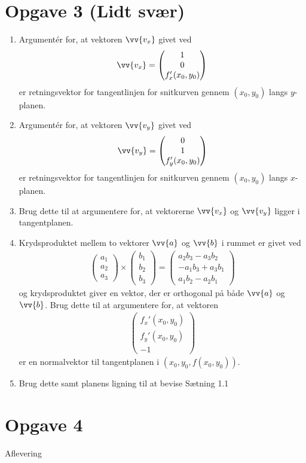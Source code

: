 \section*{Opgave 3 (Lidt svær)}

\begin{enumerate}[label=\roman*)]
	\item Argumentér for, at vektoren $\vv{v_x}$ givet ved 
	\begin{align*}
		\vv{v_x} = 
		\begin{pmatrix}
			1 \\ 0 \\ f_x'(x_0,y_0)
		\end{pmatrix}
	\end{align*}
	er retningsvektor for tangentlinjen for snitkurven gennem $(x_0,y_0)$ langs $y$-planen. 
	\item Argumentér for, at vektoren $\vv{v_y}$ givet ved 
	\begin{align*}
		\vv{v_y} = 
		\begin{pmatrix}
			0 \\ 1 \\ f_y'(x_0,y_0)
		\end{pmatrix}
	\end{align*}
	er retningsvektor for tangentlinjen for snitkurven gennem $(x_0,y_0)$ langs $x$-planen. 
	\item Brug dette til at argumentere for, at vektorerne $\vv{v_x}$ og $\vv{v_y}$ ligger i 
	tangentplanen. 
	\item Krydsproduktet mellem to vektorer $\vv{a}$ og $\vv{b}$ i rummet er givet ved
	\begin{align*}
		\begin{pmatrix}
			a_1 \\ a_2 \\ a_3
		\end{pmatrix} \times 
		\begin{pmatrix}
			b_1 \\ b_2 \\ b_3
		\end{pmatrix} = 
		\begin{pmatrix}
		a_2b_3-a_3b_2 \\ 
		-a_1b_3+a_3b_1 \\
		a_1b_2-a_2b_1
		\end{pmatrix}
	\end{align*}
	og krydsproduktet giver en vektor, der er orthogonal på både $\vv{a}$ og $\vv{b}$. 
	Brug dette til at argumentere for, at vektoren
	\begin{align*}
		\begin{pmatrix}
			f_x'(x_0,y_0) \\
			f_y'(x_0,y_0) \\
			-1
		\end{pmatrix}
	\end{align*}
	er en normalvektor til tangentplanen i $(x_0,y_0,f(x_0,y_0))$.
	\item Brug dette samt planens ligning til at bevise Sætning 1.1
\end{enumerate}
\section*{Opgave 4}
Aflevering
